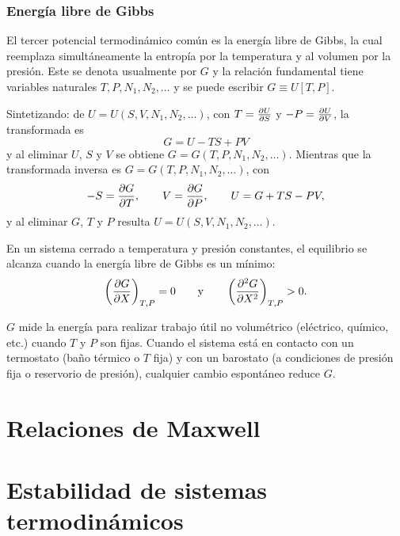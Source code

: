 \subsubsection*{Energía libre de Gibbs}

El tercer potencial termodinámico común es la energía libre de Gibbs, la cual reemplaza
simultáneamente la entropía por la temperatura y al volumen por la presión. Este se denota
usualmente por $G$ y la relación fundamental tiene
variables naturales $T,P,N_1,N_2,\dots$ y se puede escribir $G\equiv U[T,P]$.

Sintetizando: de $U=U(S,V,N_1,N_2,\dots)$, con $T=\pdv{U}{S}$ y $-P=\pdv{U}{V}$, la transformada es
\begin{equation*}
  \boxed{G=U-TS+PV}
\end{equation*}
y al eliminar $U$, $S$ y $V$ se obtiene $G=G(T,P,N_1,N_2,\dots)$. Mientras que la transformada inversa
es $G=G(T,P,N_1,N_2,\dots)$, con
\begin{equation*}
  -S=\pdv{G}{T},\qquad V=\pdv{G}{P},\qquad U=G+TS-PV,
\end{equation*}
y al eliminar $G$, $T$ y $P$ resulta $U=U(S,V,N_1,N_2,\dots)$.

\begin{ley}
  En un sistema cerrado a temperatura y presión constantes, el equilibrio se alcanza cuando la
  energía libre de Gibbs es un mínimo:
  \begin{equation*}
    \left(\frac{\partial G}{\partial X}\right)_{T,P}=0\qquad\text{y}\qquad\left(\frac{\partial^{2}G}{\partial X^{2}}\right)_{T,P}>0.
  \end{equation*}
\end{ley}

$G$ mide la energía para realizar trabajo útil no volumétrico (eléctrico, químico, etc.) cuando $T$ y
$P$ son fijas. Cuando el sistema está en contacto con un termostato (baño térmico o $T$ fija) y con un
barostato (a condiciones de presión fija o reservorio de presión), cualquier cambio espontáneo reduce
$G$.

\section{Relaciones de Maxwell}


\section{Estabilidad de sistemas termodinámicos}


